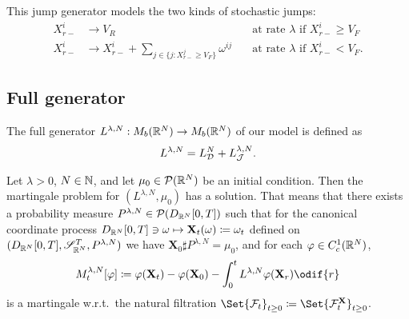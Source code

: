 \smallskip

This jump generator models the two kinds of stochastic jumps:
\begin{align}
  X_{r-}^i & \to V_R                                                           & \quad\text{at rate } \lambda \text{ if } X_{r-}^i \geq V_F \\
  X_{r-}^i & \to X_{r-}^i + \sum_{j \in \{j : X_{r-}^j \geq V_F\}} \omega^{ij} & \quad\text{at rate } \lambda \text{ if } X_{r-}^i < V_F.
\end{align}


\subsection{Full generator}

The full generator \(L^{\lambda, N} : M_b(\mathbb{R}^N) \to M_b(\mathbb{R}^N)\) of our model is defined as
\begin{equation}
  L^{\lambda, N} = L_{\mathcal{D}}^{N} + L_{\mathcal{J}}^{\lambda, N}.
\end{equation}


\begin{theorem}\label{thm:mart-problem-sol}
  Let \(\lambda > 0\), \( N \in \mathbb{N} \), and let \(\mu_0 \in \mathcal{P}(\mathbb{R}^N)\) be an initial condition.
  Then the martingale problem for \((L^{\lambda, N}, \mu_0)\) has a solution. %
  That means that there exists a probability measure \(P^{\lambda, N} \in \mathcal{P}(D_{\mathbb{R}^N}[0,T])\) such that for the canonical coordinate process \(D_{\mathbb{R}^N}[0,T] \ni \mathbf{\omega} \mapsto \mathbf{X}_t(\mathbf{\omega}) \coloneqq \mathbf{\omega}_t\) defined on \((D_{\mathbb{R}^N}[0,T], \mathscr{S}_{\mathbb{R}^N}^T, P^{\lambda, N})\) we have \( \bm{X}_0 \sharp P^{\lambda, N} = \mu_0 \), and for each \(\varphi \in C_c^1(\mathbb{R}^N)\), %
  \begin{equation}\label{eq:M-def}
    M_t^{\lambda, N}[\varphi]
    \coloneqq \varphi(\bm{X}_t) - \varphi(\bm{X}_0) - \int_0^t L^{\lambda, N} \varphi(\bm{X}_r) \odif{r}
  \end{equation}
  is a martingale w.r.t.\ the natural filtration \(\Set{\cF_t}_{t\geq0} \coloneqq \Set{\cF_t^\bm{X}}_{t\geq0}\).    %
\end{theorem}

